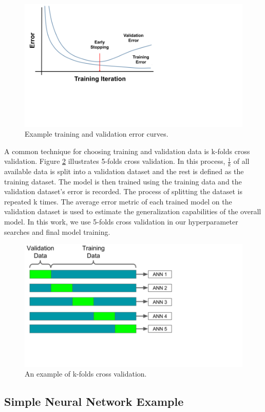 \begin{figure}[H]
	\centering
	\includegraphics[trim=0 190 390 0,clip,width=0.7\linewidth]{images/training_testing_error_v2}
	\caption{Example training and validation error curves.}
	\label{fig:training_testing_error}
\end{figure}

A common technique for choosing training and validation data is k-folds cross validation. Figure \ref{fig:kfolds} illustrates 5-folds cross validation. In this process, $\frac{1}{k}$ of all available data is split into a validation dataset and the rest is defined as the training dataset. The model is then trained using the training data and the validation dataset's error is recorded. The process of splitting the dataset is repeated k times. The average error metric of each trained model on the validation dataset is used to estimate the generalization capabilities of the overall model. In this work, we use 5-folds cross validation in our hyperparameter searches and final model training.


\begin{figure}[H]
	\centering
	\includegraphics[trim=0 140 310 0,clip,width=0.7\linewidth]{images/kfolds}
	\caption{An example of k-folds cross validation.}
	\label{fig:kfolds}
\end{figure}

\subsection{Simple Neural Network Example}


